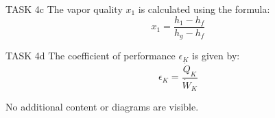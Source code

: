 TASK 4c  
The vapor quality \( x_1 \) is calculated using the formula:  
\[
x_1 = \frac{h_1 - h_f}{h_g - h_f}
\]

TASK 4d  
The coefficient of performance \( \epsilon_K \) is given by:  
\[
\epsilon_K = \frac{\dot{Q}_K}{\dot{W}_K}
\]

No additional content or diagrams are visible.